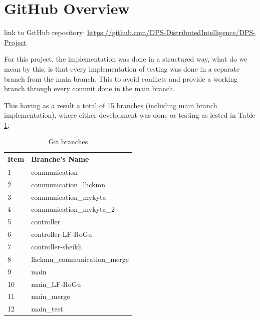 
\section*{GitHub Overview}

link to GitHub repository: \url{https://github.com/DPS-DistributedIntelligence/DPS-Project}

For this project, the implementation was done in a structured way, what do we mean by this, is that every implementation of testing was done in a separate branch from the main branch. This to avoid conflicts and provide a working branch through every commit done in the main branch.

This having as a result a total of 15 branches (including main branch implementation), where either development was done or testing as lested in Table \ref{tab:git_branches};


\begin{table}
\centering
\caption{Git branches}
\begin{tabular}{|l|l|} 
\hline
Item        & Branche's Name  \\ 
\hline
1           & communication             \\ 
\hline
2           & communication\_lhckmn           \\ 
\hline
3           & communication\_mykyta            \\
\hline
4           & communication\_mykyta\_2             \\
\hline
5           & controller             \\
\hline
6           & controller-LF-RoGu             \\
\hline
7           & controller-sheikh             \\
\hline
8           & lhckmn\_communication\_merge             \\
\hline
9           & main             \\
\hline
10          & main\_LF-RoGu             \\
\hline
11          & main\_merge             \\
\hline
12          & main\_test             \\
\hline
\end{tabular}
\label{tab:git_branches}
\end{table}

